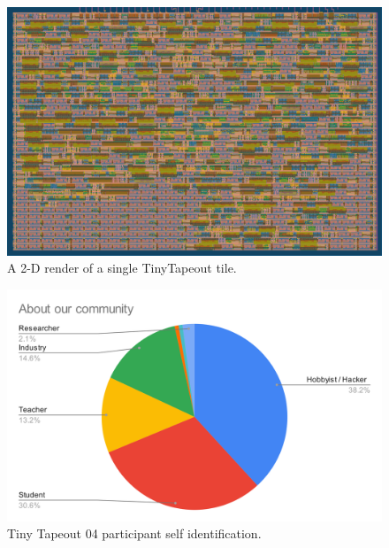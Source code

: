 \begin{figure}[!t]
\centering
\includegraphics[width=\columnwidth]{./Figs/gh action gds layout.png}
\caption{A 2-D render of a single TinyTapeout tile.}
\label{fig:render_cells_in_use}
\end{figure}

\begin{figure}[!t]
\centering
\includegraphics[width=\columnwidth]{./Figs/about our community pie chart.png}
\caption{Tiny Tapeout 04 participant self identification.}
\label{fig:TT04_submitters}
\end{figure}
